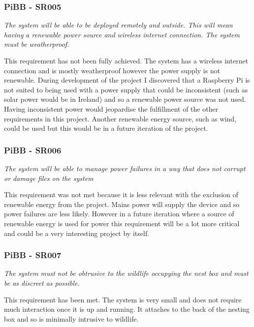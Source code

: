 \documentclass[10pt,a4paper]{article}
\begin{document}
\subsubsection{PiBB - SR005}
\begin{center}
\textit{The system will be able to be deployed remotely and outside. This will mean having a renewable power source and wireless internet connection. The system must be weatherproof.}
\linebreak
\end{center}
This requirement has not been fully achieved. The system has a wireless internet connection and is mostly weatherproof however the power supply is not renewable. During development of the project I discovered that a Raspberry Pi is not suited to being used with a power supply that could be inconsistent (such as solar power would be in Ireland) and so a renewable power source was not used. Having inconsistent power would jeopardise the fulfillment of the other requirements in this project. Another renewable energy source, such as wind, could be used but this would be in a future iteration of the project. 

\subsubsection{PiBB - SR006}
\begin{center}
\textit{The system will be able to manage power failures in a way that does not corrupt or damage files on the system}
\linebreak
\end{center}
This requirement was not met because it is less relevant with the exclusion of renewable energy from the project. Mains power will supply the device and so power failures are less likely. However in a future iteration where a source of renewable energy is used for power this requirement will be a lot more critical and could be a very interesting project by itself.


\subsubsection{PiBB - SR007}
\begin{center}
\textit{The system must not be obtrusive to the wildlife occupying the nest box and must be as discreet as possible. }
\linebreak
\end{center}
This requirement has been met. The system is very small and does not require much interaction once it is up and running. It attaches to the back of the nesting box and so is minimally intrusive to wildlife. 
\end{document}
